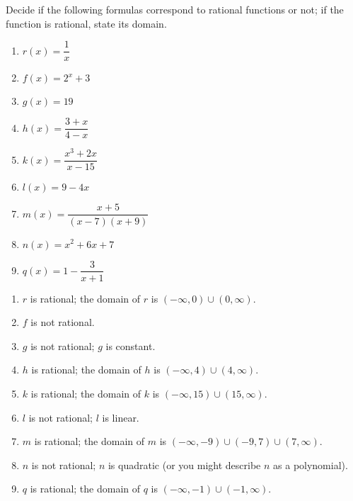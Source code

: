 \begin{pccexample}
	Decide if the following formulas correspond to rational functions 
	or not; if the function is rational, state its domain.
	\begin{multicols}{3}
		\begin{enumerate}
			\item $r(x)=\dfrac{1}{x}$
			\item $f(x)=2^x+3$
			\item $g(x)=19$
			\item $h(x)=\dfrac{3+x}{4-x}$
			\item $k(x)=\dfrac{x^3+2x}{x-15}$
			\item $l(x)=9-4x$
			\item $m(x)=\dfrac{x+5}{(x-7)(x+9)}$
			\item $n(x)=x^2+6x+7$
			\item $q(x)=1-\dfrac{3}{x+1}$
		\end{enumerate}
	\end{multicols}
	\begin{pccsolution}
		\begin{enumerate}
			\item $r$ is rational; the domain of $r$ is $(-\infty,0)\cup(0,\infty)$.
			\item $f$ is not rational.
			\item $g$ is not rational; $g$ is constant.
			\item $h$ is rational; the domain of $h$ is $(-\infty,4)\cup(4,\infty)$.
			\item $k$ is rational; the domain of $k$ is $(-\infty,15)\cup(15,\infty)$.
			\item $l$ is not rational; $l$ is linear.
			\item $m$ is rational; the domain of $m$ is $(-\infty,-9)\cup(-9,7)\cup(7,\infty)$.
			\item $n$ is not rational; $n$ is quadratic (or you might describe $n$ as a polynomial).
			\item $q$ is rational; the domain of $q$ is $(-\infty,-1)\cup (-1,\infty)$.
		\end{enumerate}
	\end{pccsolution}
\end{pccexample}

